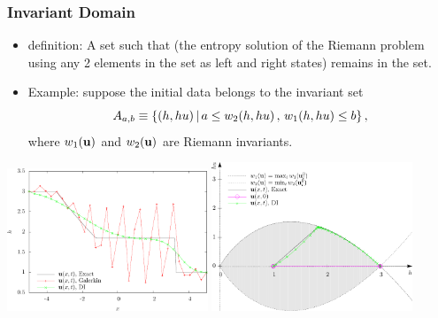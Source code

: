 \documentclass{beamer} \useoutertheme{infolines}
\begin{document}
\begin{frame}
\frametitle{Invariant Domain}

\begin{itemize}
  \item {} definition: A set such that (the entropy solution
    of the Riemann problem
    using any 2 elements in the set as left and right states) remains in the set.
  \item Example: suppose the initial data belongs to the invariant set 
    \[
      A_{a,b} \equiv \{(h,h u) \,|\,
        a \leq w_2(h, h u) \,, \, w_1(h, h u) \leq b\} \,,
    \]
    where $w_1(\mathbf{u})$ and $w_2(\mathbf{u})$ are Riemann invariants.
\end{itemize}

\begin{center}
  \includegraphics[width=0.45\textwidth]{./figures/dam_break_height.pdf}
  \hspace{1ex}
  \includegraphics[width=0.45\textwidth]{./figures/dam_break_phase_without_galerkin.pdf}
\end{center}

\end{frame}
\end{document}
